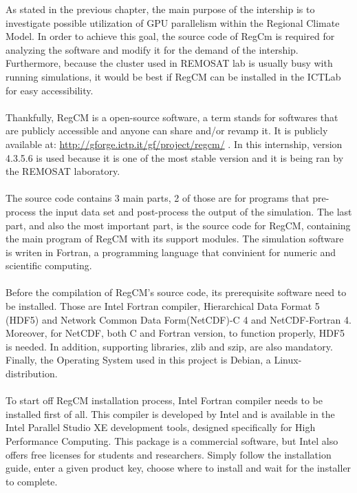 As stated in the previous chapter, the main purpose of the intership is to investigate possible utilization of GPU parallelism within the Regional Climate Model. In order to achieve this goal, the source code of RegCm is required for analyzing the software and modify it for the demand of the intership. Furthermore, because the cluster used in REMOSAT lab is usually busy with running simulations, it would be best if RegCM can be installed in the ICTLab for easy accessibility. \\
~\\
Thankfully, RegCM is a open-source software, a term stands for softwares that are publicly accessible and anyone can share and/or revamp it. It is publicly available at: \url{http://gforge.ictp.it/gf/project/regcm/} . In this internship, version 4.3.5.6 is used because it is one of the most stable version and it is being ran by the REMOSAT laboratory. \\
~\\
The source code contains 3 main parts, 2 of those are for programs that pre-process the input data set and post-process the output of the simulation. The last part, and also the most important part, is the source code for RegCM, containing the main program of RegCM with its support modules. The simulation software is writen in Fortran, a programming language that convinient for numeric and scientific computing. \\
~\\
Before the compilation of RegCM's source code, its prerequisite software need to be installed. Those are Intel Fortran compiler, Hierarchical Data Format 5 (HDF5) and Network Common Data Form(NetCDF)-C 4 and NetCDF-Fortran 4. Moreover, for NetCDF, both C and Fortran version, to function properly, HDF5 is needed. In addition, supporting libraries, zlib and szip, are also mandatory. Finally, the Operating System used in this project is Debian, a Linux-distribution. \\
~\\
To start off RegCM installation process, Intel Fortran compiler needs to be installed first of all. This compiler is developed by Intel and is available in the Intel Parallel Studio XE development tools, designed specifically for High Performance Computing. This package is a commercial software, but Intel also offers free licenses for students and researchers. Simply follow the installation guide, enter a given product key, choose where to install and wait for the installer to complete. \\
